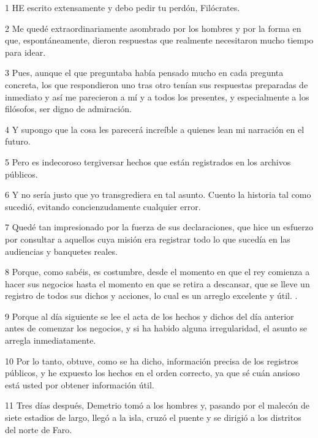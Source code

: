 \par 1 HE escrito extensamente y debo pedir tu perdón, Filócrates.

\par 2 Me quedé extraordinariamente asombrado por los hombres y por la forma en que, espontáneamente, dieron respuestas que realmente necesitaron mucho tiempo para idear.

\par 3 Pues, aunque el que preguntaba había pensado mucho en cada pregunta concreta, los que respondieron uno tras otro tenían sus respuestas preparadas de inmediato y así me parecieron a mí y a todos los presentes, y especialmente a los filósofos, ser digno de admiración.

\par 4 Y supongo que la cosa les parecerá increíble a quienes lean mi narración en el futuro.

\par 5 Pero es indecoroso tergiversar hechos que están registrados en los archivos públicos.

\par 6 Y no sería justo que yo transgrediera en tal asunto. Cuento la historia tal como sucedió, evitando concienzudamente cualquier error.

\par 7 Quedé tan impresionado por la fuerza de sus declaraciones, que hice un esfuerzo por consultar a aquellos cuya misión era registrar todo lo que sucedía en las audiencias y banquetes reales.

\par 8 Porque, como sabéis, es costumbre, desde el momento en que el rey comienza a hacer sus negocios hasta el momento en que se retira a descansar, que se lleve un registro de todos sus dichos y acciones, lo cual es un arreglo excelente y útil. .

\par 9 Porque al día siguiente se lee el acta de los hechos y dichos del día anterior antes de comenzar los negocios, y si ha habido alguna irregularidad, el asunto se arregla inmediatamente.

\par 10 Por lo tanto, obtuve, como se ha dicho, información precisa de los registros públicos, y he expuesto los hechos en el orden correcto, ya que sé cuán ansioso está usted por obtener información útil.

\par 11 Tres días después, Demetrio tomó a los hombres y, pasando por el malecón de siete estadios de largo, llegó a la isla, cruzó el puente y se dirigió a los distritos del norte de Faro.

